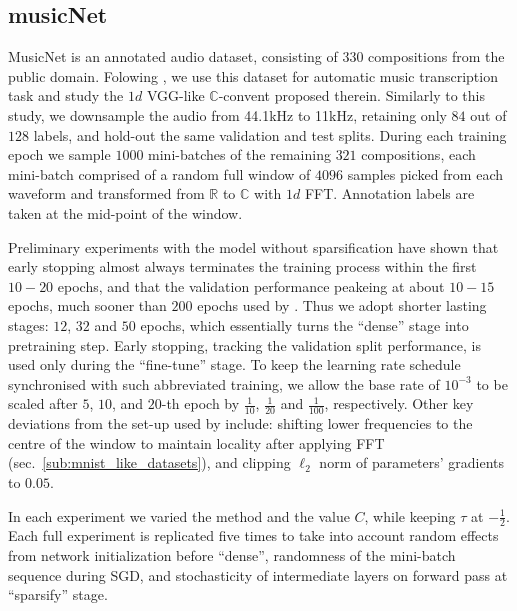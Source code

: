 \documentclass[a4paper,10pt]{article}
\newcommand{\real}{\mathbb{R}}
\newcommand{\cplx}{\mathbb{C}}
\begin{document}


\subsection{musicNet} %
\label{sub:musicnet}

MusicNet \citep{thickstun_learning_2017} is an annotated audio dataset, consisting of $330$
compositions from the public domain. Folowing \citet{trabelsi_deep_2017}, we use this
dataset for automatic music transcription task and study the $1d$ VGG-like $\cplx$-convent
proposed therein. Similarly to this study, we downsample the audio from 44.1kHz to 11kHz,
retaining only $84$ out of $128$ labels, and hold-out the same validation and test splits.
During each training epoch we sample $1000$ mini-batches of the remaining $321$ compositions,
each mini-batch comprised of a random full window of $4096$ samples picked from each waveform
and transformed from $\real$ to $\cplx$ with $1d$ FFT. Annotation labels are taken at the
mid-point of the window.

Preliminary experiments with the model without sparsification have shown that early stopping
almost always terminates the training process within the first $10-20$ epochs, and that the
validation performance peakeing at about $10-15$ epochs, much sooner than $200$ epochs used by
\citet{trabelsi_deep_2017}. Thus we adopt shorter lasting stages: $12$, $32$ and $50$ epochs,
which essentially turns the ``dense'' stage into pretraining step. Early stopping, tracking
the validation split performance, is used only during the ``fine-tune'' stage. To keep the
learning rate schedule synchronised with such abbreviated training, we allow the base rate
of $10^{-3}$ to be scaled after $5$, $10$, and $20$-th epoch by $\tfrac1{10}$, $\tfrac1{20}$
and $\tfrac1{100}$, respectively. Other key deviations from the set-up used by \citet{trabelsi_deep_2017}
include: shifting lower frequencies to the centre of the window to maintain locality after
applying FFT (sec.~\ref{sub:mnist_like_datasets}), and clipping $\ell_2$ norm of parameters'
gradients to $0.05$.

In each experiment we varied the method and the value $C$, while keeping $\tau$ at $-\tfrac12$.
Each full experiment is replicated five times to take into account random effects from network
initialization before ``dense'', randomness of the mini-batch sequence during SGD, and
stochasticity of intermediate layers on forward pass at ``sparsify'' stage.
\end{document}
